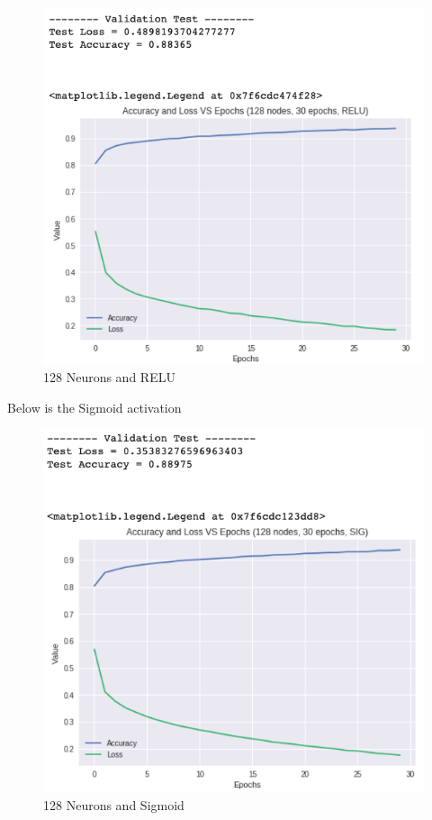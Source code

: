 \documentclass[a4paper, 12pt]{article}
\begin{document}
    \begin{figure}[h!]
        \centering
        \captionsetup{justification=centering}
        \includegraphics[scale = 0.3]{128_RELU.png}
        \caption{128 Neurons and RELU}
    \end{figure}

    Below is the Sigmoid activation
    
    \begin{figure}[h!]
        \centering
        \captionsetup{justification=centering}
        \includegraphics[scale = 0.3]{128_SIG.png}
        \caption{128 Neurons and Sigmoid}
    \end{figure}
\end{document}
